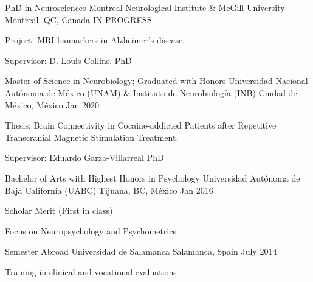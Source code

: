 \begin{cventries}
    \cventry
        {PhD in Neurosciences}
        {Montreal Neurological Institute \& McGill University}
        {Montreal, QC, Canada}
        {IN PROGRESS}
        {
            \begin{cvitems}
                \item {Project: MRI biomarkers in Alzheimer's disease.}
                \item {Supervisor: D. Louis Collins, PhD}
            \end{cvitems}
        }
    \cventry
        {Master of Science in Neurobiology; Graduated with Honors}
        {Universidad Nacional Autónoma de México (UNAM) \& Instituto de
        Neurobiología (INB)}
        {Ciudad de México, México}
        {Jan 2020}
        {
            \begin{cvitems}
                \item {Thesis: Brain Connectivity in Cocaine-addicted Patients after Repetitive Transcranial Magnetic Stimulation Treatment.}
                \item {Supervisor: Eduardo Garza-Villarreal PhD}
            \end{cvitems}
        }
    \cventry
        {Bachelor of Arts with Highest Honors in Psychology}
        {Universidad Autónoma de Baja California (UABC)}
        {Tijuana, BC, México}
        {Jan 2016}
        {
            \begin{cvitems}
                \item {Scholar Merit (First in class)}
                \item {Focus on Neuropsychology and Psychometrics}
            \end{cvitems}
        }
    \cventry
        {Semester Abroad}
        {Universidad de Salamanca}
        {Salamanca, Spain}
        {July 2014}
        {
            \begin{cvitems}
                \item {Training in clinical and vocational evaluations}
            \end{cvitems}
        }
\end{cventries}
